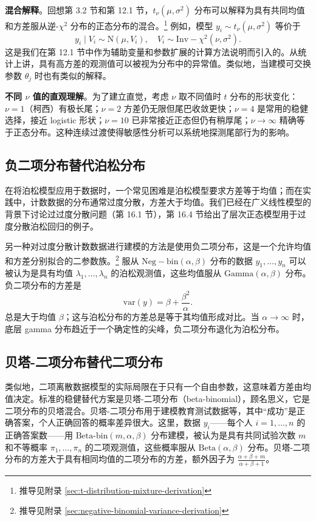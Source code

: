 \textbf{混合解释}。回想第 3.2 节和第 12.1 节，$t_\nu(\mu, \sigma^2)$ 分布可以解释为具有共同均值和方差服从逆-$\chi^2$ 分布的正态分布的混合。\footnote{推导见附录 \cref{sec:t-distribution-mixture-derivation}} 例如，模型 $y_i \sim t_\nu(\mu, \sigma^2)$ 等价于
\[
y_i \mid V_i \sim \mathrm{N}(\mu, V_i), \quad V_i \sim \mathrm{Inv-}\chi^2(\nu, \sigma^2).
\label{eq:t-distribution-mixture}
\]
这是我们在第 12.1 节中作为辅助变量和参数扩展的计算方法说明而引入的。从统计上讲，具有高方差的观测值可以被视为分布中的异常值。类似地，当建模可交换参数 $\theta_j$ 时也有类似的解释。

\textbf{不同 $\nu$ 值的直观理解}。为了建立直觉，考虑 $\nu$ 取不同值时 $t$ 分布的形状变化：$\nu = 1$（柯西）有极长尾；$\nu = 2$ 方差仍无限但尾巴收敛更快；$\nu = 4$ 是常用的稳健选择，接近 logistic 形状；$\nu = 10$ 已非常接近正态但仍有稍厚尾；$\nu \to \infty$ 精确等于正态分布。这种连续过渡使得敏感性分析可以系统地探测尾部行为的影响。

\subsection{负二项分布替代泊松分布}

在将泊松模型应用于数据时，一个常见困难是泊松模型要求方差等于均值；而在实践中，计数数据的分布通常过度分散，方差大于均值。我们已经在广义线性模型的背景下讨论过过度分散问题（第 16.1 节），第 16.4 节给出了层次正态模型用于过度分散泊松回归的例子。

另一种对过度分散计数数据进行建模的方法是使用负二项分布，这是一个允许均值和方差分别拟合的二参数族。\footnote{推导见附录 \cref{sec:negative-binomial-variance-derivation}} 服从 $\mathrm{Neg-bin}(\alpha, \beta)$ 分布的数据 $y_1, \ldots, y_n$ 可以被认为是具有均值 $\lambda_1, \ldots, \lambda_n$ 的泊松观测值，这些均值服从 $\mathrm{Gamma}(\alpha, \beta)$ 分布。负二项分布的方差是
\[
\mathrm{var}(y) = \beta + \frac{\beta^2}{\alpha}.
\label{eq:negative-binomial-variance}
\]
总是大于均值 $\beta$；这与泊松分布的方差总是等于其均值形成对比。当 $\alpha \to \infty$ 时，底层 gamma 分布趋近于一个确定性的尖峰，负二项分布退化为泊松分布。

\subsection{贝塔-二项分布替代二项分布}

类似地，二项离散数据模型的实际局限在于只有一个自由参数，这意味着方差由均值决定。标准的稳健替代方案是贝塔-二项分布（beta-binomial），顾名思义，它是二项分布的贝塔混合。贝塔-二项分布用于建模教育测试数据等，其中``成功''是正确答案，个人正确回答的概率差异很大。这里，数据 $y_i$——每个人 $i = 1, \ldots, n$ 的正确答案数——用 $\mathrm{Beta\text{-}bin}(m, \alpha, \beta)$ 分布建模，被认为是具有共同试验次数 $m$ 和不等概率 $\pi_1, \ldots, \pi_n$ 的二项观测值，这些概率服从 $\mathrm{Beta}(\alpha, \beta)$ 分布。贝塔-二项分布的方差大于具有相同均值的二项分布的方差，额外因子为 $\frac{\alpha+\beta+m}{\alpha+\beta+1}$。

